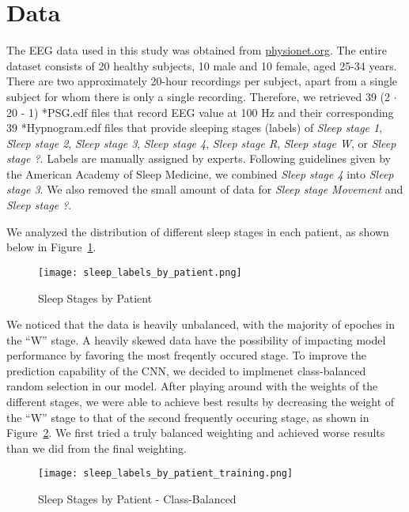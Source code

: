 \documentclass{amia}
\begin{document}
\section*{Data}
The EEG data used in this study was obtained from \href{http://physionet.org}{physionet.org}\cite{ref_PhysioNet}. The entire dataset consists of 20 healthy subjects, 10 male and 10 female, aged 25-34 years. There are two approximately 20-hour recordings per subject, apart from a single subject for whom there is only a single recording. Therefore, we retrieved 39 (2 $\cdot $ 20 - 1) *PSG.edf files that record EEG value at 100 Hz and their corresponding 39 *Hypnogram.edf files that provide sleeping stages (labels) of \textit{Sleep stage 1}, \textit{Sleep stage 2}, \textit{Sleep stage 3}, \textit{Sleep stage 4}, \textit{Sleep stage R}, \textit{Sleep stage W}, or \textit{Sleep stage ?}. Labels are manually assigned by experts. Following guidelines given by the American Academy of Sleep Medicine, we combined \textit{Sleep stage 4} into \textit{Sleep stage 3}. We also removed the small amount of data for \textit{Sleep stage Movement} and \textit{Sleep stage ?}. 

We analyzed the distribution of different sleep stages in each patient, as shown below in Figure~\ref{fig:figure2}.

\begin{figure}[htb]
\begin{center}
\texttt{[image: sleep\_labels\_by\_patient.png]}
\end{center}
\caption{Sleep Stages by Patient}
\label{fig:figure2}
\end{figure}

We noticed that the data is heavily unbalanced, with the majority of epoches in the “W” stage. A heavily skewed data have the possibility of impacting model performance by favoring the most freqently occured stage. To improve the prediction capability of the CNN, we decided to implmenet class-balanced random selection in our model. After playing around with the weights of the different stages, we were able to achieve best results by decreasing the weight of the  “W” stage to that of the second frequently occuring stage, as shown in Figure~\ref{fig:figure5}. We first tried a truly balanced weighting and achieved worse results than we did from the final weighting. 

\begin{figure}[htb]
\begin{center}
\texttt{[image: sleep\_labels\_by\_patient\_training.png]}
\end{center}
\caption{Sleep Stages by Patient - Class-Balanced}
\label{fig:figure5}
\end{figure}
\end{document}
